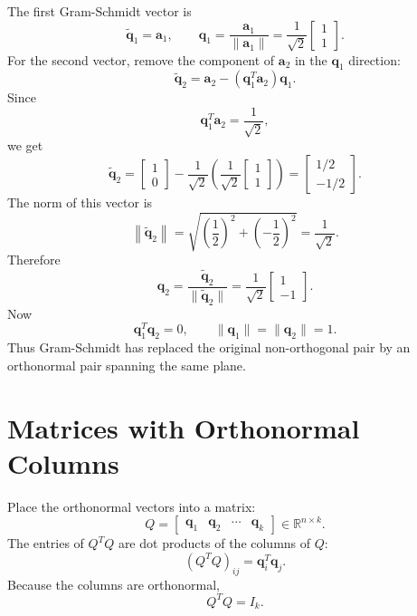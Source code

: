 The first Gram-Schmidt vector is
\[
    \widetilde{\mathbf{q}}_1=\mathbf{a}_1,
    \qquad
    \mathbf{q}_1=\frac{\mathbf{a}_1}{\|\mathbf{a}_1\|}
    =\frac{1}{\sqrt{2}}
    \begin{bmatrix}1\\1\end{bmatrix}.
\]
For the second vector, remove the component of \(\mathbf{a}_2\) in the \(\mathbf{q}_1\) direction:
\[
    \widetilde{\mathbf{q}}_2
    =
    \mathbf{a}_2-(\mathbf{q}_1^T\mathbf{a}_2)\mathbf{q}_1.
\]
Since
\[
    \mathbf{q}_1^T\mathbf{a}_2
    =\frac{1}{\sqrt{2}},
\]
we get
\[
    \widetilde{\mathbf{q}}_2
    =
    \begin{bmatrix}1\\0\end{bmatrix}
    -
    \frac{1}{\sqrt{2}}
    \left(\frac{1}{\sqrt{2}}\begin{bmatrix}1\\1\end{bmatrix}\right)
    =
    \begin{bmatrix}1/2\\-1/2\end{bmatrix}.
\]
The norm of this vector is
\[
    \left\|\widetilde{\mathbf{q}}_2\right\|
    =
    \sqrt{\left(\frac12\right)^2+\left(-\frac12\right)^2}
    =
    \frac{1}{\sqrt{2}}.
\]
Therefore
\[
    \mathbf{q}_2
    =
    \frac{\widetilde{\mathbf{q}}_2}{\|\widetilde{\mathbf{q}}_2\|}
    =
    \frac{1}{\sqrt{2}}\begin{bmatrix}1\\-1\end{bmatrix}.
\]
Now
\[
    \mathbf{q}_1^T\mathbf{q}_2=0,
    \qquad
    \|\mathbf{q}_1\|=\|\mathbf{q}_2\|=1.
\]
Thus Gram-Schmidt has replaced the original non-orthogonal pair by an orthonormal pair spanning the same plane.

\section{Matrices with Orthonormal Columns}
\label{mf:orthonormal-columns}
\label{mf:qtq-identity}

Place the orthonormal vectors into a matrix:
\[
    Q=\begin{bmatrix}
        \mathbf{q}_1 & \mathbf{q}_2 & \cdots & \mathbf{q}_k
    \end{bmatrix}\in\mathbb{R}^{n\times k}.
\]
The entries of \(Q^TQ\) are dot products of the columns of \(Q\):
\[
    (Q^TQ)_{ij}=\mathbf{q}_i^T\mathbf{q}_j.
\]
Because the columns are orthonormal,
\[
    Q^TQ=I_k.
\]

